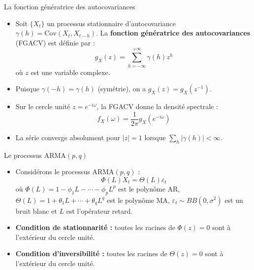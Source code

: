 \documentclass[11pt,aspectratio=169]{beamer}
\newcommand{\Cov}{\mathrm{Cov}}
\begin{document}
\begin{frame}{La fonction génératrice des autocovariances}

\begin{itemize}

\item Soit $\{X_t\}$ un processus stationnaire d'autocovariance $\gamma(h) = \Cov(X_t, X_{t-h})$. La \textbf{fonction génératrice des autocovariances} (FGACV) est définie par :
  \[
  g_X(z) = \sum_{h=-\infty}^{+\infty} \gamma(h) z^h
  \]
  où $z$ est une variable complexe.\newline

\item Puisque $\gamma(-h) = \gamma(h)$ (symétrie), on a $g_X(z) = g_X(z^{-1})$.\newline

\item Sur le cercle unité $z = e^{-i\omega}$, la FGACV donne la densité spectrale :
  \[
  f_X(\omega) = \frac{1}{2\pi} g_X(e^{-i\omega})
  \]\newline

\item La série converge absolument pour $|z| = 1$ lorsque $\sum_{h} |\gamma(h)| < \infty$.

\end{itemize}

\end{frame}


\begin{frame}{Le processus ARMA$(p,q)$}

\begin{itemize}

\item Considérons le processus ARMA$(p,q)$ :
  \[
  \Phi(L) X_t = \Theta(L) \varepsilon_t
  \]
  où $\Phi(L) = 1 - \phi_1 L - \cdots - \phi_p L^p$ est le polynôme AR, $\Theta(L) = 1 + \theta_1 L + \cdots + \theta_q L^q$ est le polynôme MA, $\varepsilon_t \sim BB(0, \sigma^2)$ est un bruit blanc et $L$ est l'opérateur retard.\newline

\item \textbf{Condition de stationnarité :} toutes les racines de $\Phi(z) = 0$ sont à l'extérieur du cercle unité.\newline

\item \textbf{Condition d'inversibilité :} toutes les racines de $\Theta(z) = 0$ sont à l'extérieur du cercle unité.

\end{itemize}

\end{frame}
\end{document}
